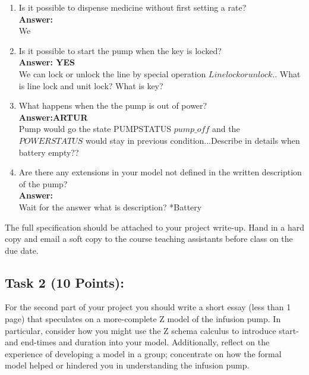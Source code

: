 \documentclass{article}
\newcommand{\head}{\subsection*}
\begin{document}
\begin{enumerate}
    \item Is it possible to dispense medicine without first
    setting a rate?
    \\
    \textbf{Answer:}\\
    We 
    
    \item Is it possible to start the pump when the key is locked?
    \\
    \textbf{Answer: YES}\\
    We can lock or unlock the line by special operation $Linelockorunlock$.. What is line lock and unit lock? What is key? 
    \item What happens when the the pump is out of power?
    \\
    \textbf{Answer:ARTUR}\\
    Pump would go the state PUMPSTATUS $pump\_off$ and the $POWERSTATUS$ would stay in previous condition...Describe in details when battery empty?? 
    \item Are there any extensions in your model not defined in
    the written description of the pump?
    \\
    \textbf{Answer:}\\
    Wait for the answer what is description? *Battery
\end{enumerate}

\noindent The full specification should be attached to your project
write-up. Hand in a hard copy and email a soft copy to the course
teaching assistants before class on the due date.

\head{Task 2 (10 Points):}

For the second part of your project you should write a short essay
(less than 1 page) that speculates on a more-complete Z model of the infusion pump. In particular, consider how you might use the Z schema calculus to introduce start- and end-times and duration into your model.
Additionally, reflect on the experience of developing a model in a
group; concentrate on how the formal model helped or hindered you in
understanding the infusion pump.
\end{document}
